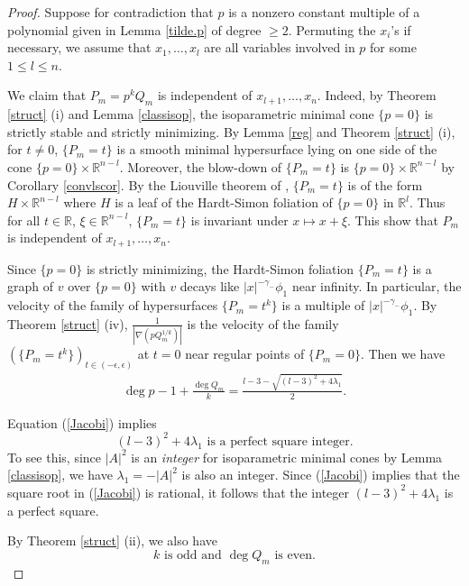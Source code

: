 \documentclass[pdflatex,sn-mathphys-num]{sn-jnl}%
\theoremstyle{thmstyleone}%
\theoremstyle{thmstyletwo}%
\theoremstyle{thmstylethree}%
\newcommand{\R}{\mathbb{R}}
\begin{document}
\begin{proof}
	Suppose for contradiction that $p $ is a nonzero constant multiple of a polynomial given in Lemma \ref{tilde.p} of degree $\ge 2$. Permuting the $x_i$'s if necessary, we assume that $x_1,\dots,x_l$ are all variables involved in $p$ for some $1\le l\le n$.
	
	We claim that $P_m=p ^kQ_m$ is independent of $x_{l+1},\dots,x_n$. Indeed, by Theorem \ref{struct} (i) and Lemma \ref{classisop}, the isoparametric minimal cone $\{p =0\}$ is strictly stable and strictly minimizing. By Lemma \ref{reg} and Theorem \ref{struct} (i), for $t\neq 0$, $\{P_m=t\}$ is a smooth minimal hypersurface lying on one side of the cone $\{p =0\}\times \R^{n-l}$. Moreover, the blow-down of $\{P_m=t\}$ is $\{p=0\}\times \R^{n-l}$ by Corollary \ref{convlscor}. By the Liouville theorem of \cite{ES}, $\{P_m=t\}$ is of the form $H\times \R^{n-l}$ where $H$ is a leaf of the Hardt-Simon foliation of $\{p =0\}$ in $\R^l$. Thus for all $t\in \R$, $\xi\in \R^{n-l}$, $\{P_m=t\}$ is invariant under $x\mapsto x+\xi$. This show that $P_m$ is independent of $x_{l+1},\dots,x_n$.
	
	Since $\{p =0\}$ is strictly minimizing, the Hardt-Simon foliation $\{P_m=t\}$ is a graph of $v$ over $\{p =0\}$ with $v$ decays like $|x|^{-\gamma_{-}}\phi_1$ near infinity. In particular, the velocity of the family of hypersurfaces $\{P_m=t^k\}$ is a multiple of $|x|^{-\gamma_{-}}\phi_1$. By Theorem \ref{struct} (iv), $\frac{1}{|\nabla (p Q_m^{1/k})|}$ is the velocity of the family $(\{P_m=t^{k}\})_{t\in (-\epsilon,\epsilon)}$ at $t=0$ near regular points of $\{P_m=0\}$. Then we have
	\begin{align}\label{Jacobi}
		\deg p -1+\frac{\deg Q_m}{k}=\frac{l-3-\sqrt{(l-3)^2+4\lambda_1}}{2}.
	\end{align}
	
	Equation (\ref{Jacobi}) implies
	\begin{equation}
		\label{crtn1} (l-3)^2+4\lambda_1\text{ is a perfect square integer.}
	\end{equation}
	To see this, since $|A|^2$ is an \textit{integer} for isoparametric minimal cones by Lemma \ref{classisop}, we have $\lambda_1=-|A|^2$ is also an integer. Since (\ref{Jacobi}) implies that the square root in (\ref{Jacobi}) is rational, it follows that the integer $(l-3)^2+4\lambda_1$ is a perfect square.
	
	By Theorem \ref{struct} (ii), we also have
	\begin{equation}
		\label{crtn2} k\text{ is odd and }\deg Q_m\text{ is even.}
	\end{equation}
	

\end{proof}
\end{document}
